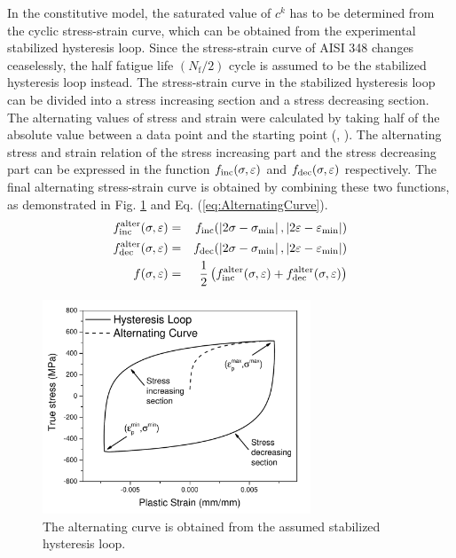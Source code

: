 \documentclass[preprint,5p,twocolumn,10pt,sort&compress]{elsarticle}
\begin{document}
In the constitutive model, the saturated value of $c^{k}$ has to be determined from the cyclic stress-strain curve, which can be obtained from the experimental stabilized hysteresis loop. Since the stress-strain curve of AISI 348 changes ceaselessly, the half fatigue life $\left (N_{\mathrm{f}} / 2\right)$ cycle is assumed to be the stabilized hysteresis loop instead. The stress-strain curve in the stabilized hysteresis loop can be divided into a stress increasing section and a stress decreasing section. The alternating values of stress and strain were calculated by taking half of the absolute value between a data point and the starting point (\citeauthor{SunCyclic}, \citeyear{SunCyclic}). The alternating stress and strain relation of the stress increasing part and the stress decreasing part can be expressed in the function $f_{\rm  inc } (\sigma, \varepsilon)$ and $f_{\rm { dec }} (\sigma, \varepsilon)$ respectively. The final alternating stress-strain curve is obtained by combining these two functions, as demonstrated in Fig. \ref{fig:Alternating Curve} and Eq. (\ref{eq:AlternatingCurve}).
\begin{eqnarray}\label{eq:AlternatingCurve}
f_{\rm { inc }}^{\rm {alter}} (\sigma, \varepsilon)&=&f_{\rm { inc }} (\left|2 \sigma-\sigma_{\min }\right|, \left|2 \varepsilon-\varepsilon_{\min }\right|)\\
f_{\rm { dec }}^{\rm {alter}}(\sigma, \varepsilon)&=&f_{\rm { dec }}(\left|2 \sigma-\sigma_{\min }\right|, \left|2 \varepsilon-\varepsilon_{\min }\right|)\\
f(\sigma, \varepsilon)&=&\frac{1}{2}\left(f_{\rm { inc }}^{\rm {alter}}(\sigma, \varepsilon)+f_{\rm { dec }}^{\rm {alter}}(\sigma, \varepsilon)\right)
\end{eqnarray}
\begin{figure}[htbp]
  \begin{center}
  \includegraphics[width=8cm]{AlternatingCurve.pdf}
  \caption{The alternating curve is obtained from the assumed stabilized hysteresis loop.}
  \label{fig:Alternating Curve}
  \end{center}
\end{figure}
\end{document}

